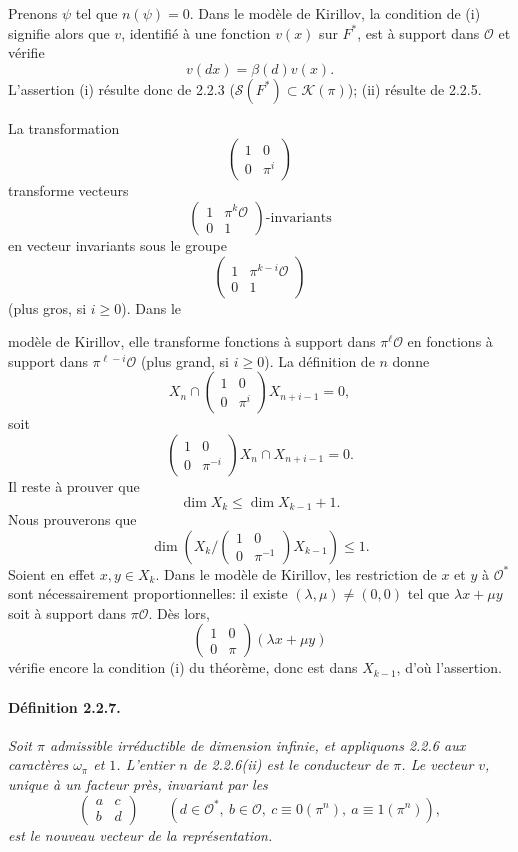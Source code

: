 \documentclass[10pt,a4paper]{article}
\providecommand{\OO}{\mathcal O}
\providecommand{\calK}{\mathcal K}
\begin{document}
Prenons \(\psi\) tel que \(n(\psi)=0\). Dans le modèle de Kirillov, la condition de (i) signifie alors que \(v\), identifié à une fonction \(v(x)\) sur \(F^*\), est à support dans \(\OO\) et vérifie
\[
v(dx)=\beta(d)v(x).
\]
L'assertion (i) résulte donc de 2.2.3 (\(\mathcal S(F^*)\subset\calK(\pi)\)); (ii) résulte de 2.2.5.

La transformation
\[
\begin{pmatrix}1&0\\0&\pi^{i}\end{pmatrix}
\]
transforme vecteurs
\[
\begin{pmatrix}1&\pi^k\OO\\0&1\end{pmatrix}\text{-invariants}
\]
en vecteur invariants sous le groupe
\[
\begin{pmatrix}1&\pi^{k-i}\OO\\0&1\end{pmatrix}
\]
(plus gros, si \(i\ge0\)). Dans le

\clearpage
{}
\hypertarget{authority-28}{}
modèle de Kirillov, elle transforme fonctions à support dans \(\pi^\ell\OO\) en fonctions à support dans \(\pi^{\ell-i}\OO\) (plus grand, si \(i\ge0\)). La définition de \(n\) donne
\[
X_n\cap
\begin{pmatrix}1&0\\0&\pi^i\end{pmatrix}X_{n+i-1}=0,
\]
soit
\[
\begin{pmatrix}1&0\\0&\pi^{-i}\end{pmatrix}X_n\cap X_{n+i-1}=0.
\]
Il reste à prouver que
\[
\dim X_k\le \dim X_{k-1}+1.
\]
Nous prouverons que
\[
\dim\left(X_k\Big/
\begin{pmatrix}1&0\\0&\pi^{-1}\end{pmatrix}X_{k-1}\right)\le1.
\]
Soient en effet \(x,y\in X_k\). Dans le modèle de Kirillov, les restriction de \(x\) et \(y\) à \(\OO^*\) sont nécessairement proportionnelles: il existe \((\lambda,\mu)\ne(0,0)\) tel que \(\lambda x+\mu y\) soit à support dans \(\pi\OO\). Dès lors,
\[
\begin{pmatrix}1&0\\0&\pi\end{pmatrix}(\lambda x+\mu y)
\]
vérifie encore la condition (i) du théorème, donc est dans \(X_{k-1}\), d'où l'assertion.

\paragraph{Définition 2.2.7.}{\itshape  Soit \(\pi\) admissible irréductible de dimension infinie, et appliquons 2.2.6 aux caractères \(\omega_\pi\) et \(1\). L'entier \(n\) de 2.2.6(ii) est le conducteur de \(\pi\). Le vecteur \(v\), unique à un facteur près, invariant par les
\[
\begin{pmatrix}a&c\\b&d\end{pmatrix}
\qquad
(d\in\OO^*,\ b\in\OO,\ c\equiv0(\pi^n),\ a\equiv1(\pi^n)),
\]
est le nouveau vecteur de la représentation.\par}
\end{document}
